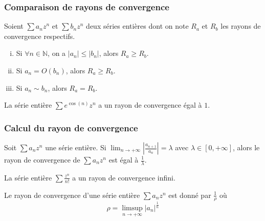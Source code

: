 	\subsubsection{Comparaison de rayons de convergence}


	Soient $\sum a_n z^n$ et $\sum b_n z^n$ deux séries entières dont on note $R_a$ et $R_b$ les rayons de convergence respectifs.

	\begin{proposition}
		\begin{enumerate}[(i)]
			\item Si $\forall n \in \mathbb{N}$, on a $|a_n| \leq |b_n|$, alors $R_a \geq R_b$.
			\item Si $a_n = O(b_n)$, alors $R_a \geq R_b$.
			\item Si $a_n \sim b_n$, alors $R_a = R_b$.
		\end{enumerate}
	\end{proposition}

	\begin{example}
		La série entière $\sum e^{\cos(n)} z^n$ a un rayon de convergence égal à $1$.
	\end{example}

	\subsubsection{Calcul du rayon de convergence}


	\begin{proposition}
		Soit $\sum a_n z^n$ une série entière. Si $\lim_{n \rightarrow +\infty} \left| \frac{a_{n+1}}{a_n} \right| = \lambda$ avec $\lambda \in [0, +\infty]$, alors le rayon de convergence de $\sum a_n z^n$ est égal à $\frac{1}{\lambda}$.
	\end{proposition}

	\begin{example}
		La série entière $\sum \frac{z^n}{n!}$ a un rayon de convergence infini.
	\end{example}

	\begin{proposition}
		Le rayon de convergence d'une série entière $\sum a_n z^n$ est donné par $\frac{1}{\rho}$ où
		\[ \rho = \limsup_{n \rightarrow +\infty} |a_n|^{\frac{1}{n}} \]
	\end{proposition}


